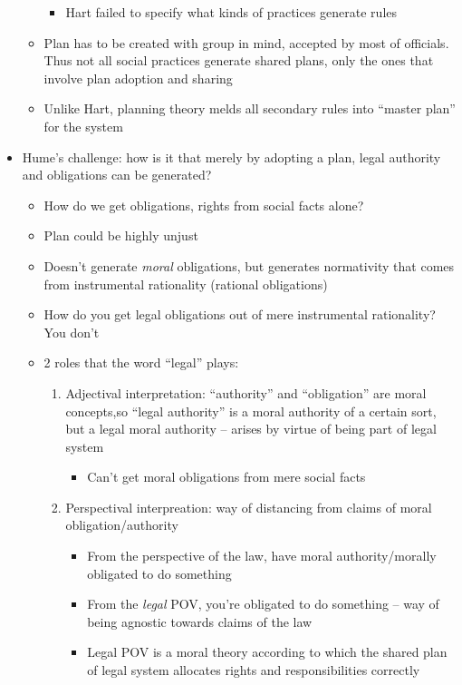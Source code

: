 \begin{itemize}
\begin{itemize}
    \begin{itemize}
    \tightlist
    \item
      Hart failed to specify what kinds of practices generate rules
    \end{itemize}
  \item
    Plan has to be created with group in mind, accepted by most of
    officials. Thus not all social practices generate shared plans, only
    the ones that involve plan adoption and sharing
  \item
    Unlike Hart, planning theory melds all secondary rules into ``master
    plan'' for the system
  \end{itemize}
\item
  Hume's challenge: how is it that merely by adopting a plan, legal
  authority and obligations can be generated?

  \begin{itemize}
  \tightlist
  \item
    How do we get obligations, rights from social facts alone?
  \item
    Plan could be highly unjust
  \item
    Doesn't generate \emph{moral} obligations, but generates normativity
    that comes from instrumental rationality (rational obligations)
  \item
    How do you get legal obligations out of mere instrumental
    rationality? You don't
  \item
    2 roles that the word ``legal'' plays:

    \begin{enumerate}
    \def\labelenumi{\arabic{enumi}.}
    \tightlist
    \item
      Adjectival interpretation: ``authority'' and ``obligation'' are
      moral concepts,so ``legal authority'' is a moral authority of a
      certain sort, but a legal moral authority -- arises by virtue of
      being part of legal system

      \begin{itemize}
      \tightlist
      \item
        Can't get moral obligations from mere social facts
      \end{itemize}
    \item
      Perspectival interpreation: way of distancing from claims of moral
      obligation/authority

      \begin{itemize}
      \tightlist
      \item
        From the perspective of the law, have moral authority/morally
        obligated to do something
      \item
        From the \emph{legal} POV, you're obligated to do something --
        way of being agnostic towards claims of the law
      \item
        Legal POV is a moral theory according to which the shared plan
        of legal system allocates rights and responsibilities correctly


\end{itemize}
\end{enumerate}
\end{itemize}
\end{itemize}

